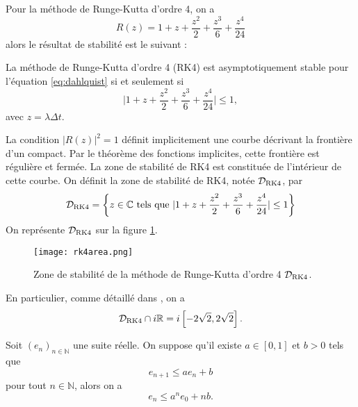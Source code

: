 Pour la méthode de Runge-Kutta d'ordre 4, on a 
\begin{equation}
R(z) = 1 + z + \dfrac{z^2}{2} + \dfrac{z^3}{6} + \dfrac{z^4}{24} 
\end{equation}
alors le résultat de stabilité est le suivant :
\begin{proposition}
La méthode de Runge-Kutta d'ordre 4 (RK4) est asymptotiquement stable pour l'équation \eqref{eq:dahlquist} si et seulement si
\begin{equation}
\vert 1 + z + \dfrac{z^2}{2} + \dfrac{z^3}{6} + \dfrac{z^4}{24}  \vert \leq 1,
\end{equation}
avec $z = \lambda \Delta t$.
\label{prop:stab_rk4}
\end{proposition}
La condition $|R(z)|^2 = 1$ définit implicitement une courbe décrivant la frontière d'un compact. Par le théorème des fonctions implicites, cette frontière est régulière et fermée. La zone de stabilité de RK4 est constituée de l'intérieur de cette courbe.
On définit la zone de stabilité de RK4, notée $\mathcal{D}_{\RK4}$, par
\begin{equation}
\mathcal{D}_{\RK4} = \left\lbrace z \in \mathbb{C} \text{ tels que } \vert 1 + z + \dfrac{z^2}{2} + \dfrac{z^3}{6} + \dfrac{z^4}{24}  \vert \leq 1 \right\rbrace
\end{equation} 
On représente $\mathcal{D}_{\RK4}$ sur la figure \ref{fig:stab_area}.
\begin{figure}[htbp]
\begin{center}
\texttt{[image: rk4area.png]}
\end{center}
\caption{Zone de stabilité de la méthode de Runge-Kutta d'ordre 4 $\mathcal{D}_{\RK4}$.}
\label{fig:stab_area}
\end{figure}

En particulier, comme détaillé dans \cite{Hundsdorfer2013}, on a
\begin{equation}
\mathcal{D}_{\RK4} \cap i \mathbb{R} = i \left[-2 \sqrt{2},2 \sqrt{2}\right].
\end{equation}

\begin{lemme}
Soit $(e_n)_{n \in \mathbb{N}}$ une suite réelle. On suppose qu'il existe $a \in [0,1]$ et $b>0$ tels que
\begin{equation}
e_{n+1} \leq a e_n + b 
\end{equation}
pour tout $n \in \mathbb{N}$, alors on a
\begin{equation}
e_n \leq a^n e_0 + nb.
\end{equation}
\label{lem:gronwall_discret}
\end{lemme}

